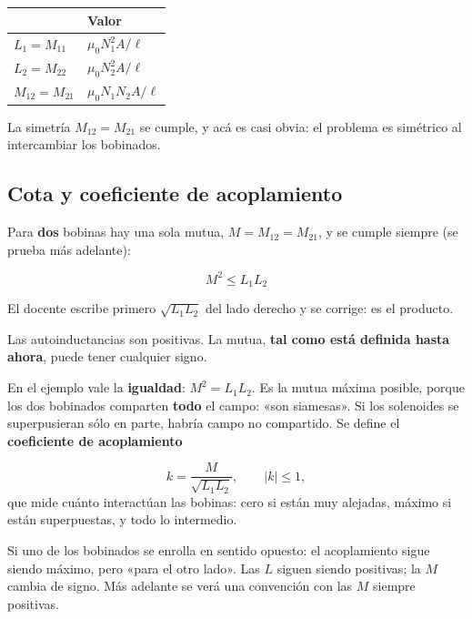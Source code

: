 \documentclass[12pt,a4paper]{article}
\begin{document}
\begin{center}
\renewcommand{\arraystretch}{1.35}
\small
\begin{tabularx}{\textwidth}{l>{\raggedright\arraybackslash}X}
\toprule
 & \textbf{Valor} \\
\midrule
$L_1 = M_{11}$ & $\mu_0 N_1^2 A/\ell$ \\
$L_2 = M_{22}$ & $\mu_0 N_2^2 A/\ell$ \\
$M_{12} = M_{21}$ & $\mu_0 N_1 N_2 A/\ell$ \\
\bottomrule
\end{tabularx}
\end{center}

La simetría $M_{12} = M_{21}$ se cumple, y acá es casi obvia: el problema es
simétrico al intercambiar los bobinados.

\subsection{Cota y coeficiente de acoplamiento}

Para \textbf{dos} bobinas hay una sola mutua, $M = M_{12} = M_{21}$, y se cumple
siempre (se prueba más adelante):

\begin{keybox}
\[
\boxed{\ M^2 \le L_1 L_2\ }
\]
\end{keybox}

\begin{notebox}
El docente escribe primero $\sqrt{L_1L_2}$ del lado derecho y se corrige: es
el producto.
\end{notebox}

Las autoinductancias son positivas. La mutua, \textbf{tal como está definida
hasta ahora}, puede tener cualquier signo.

En el ejemplo vale la \textbf{igualdad}: $M^2 = L_1 L_2$. Es la mutua máxima posible,
porque los dos bobinados comparten \textbf{todo} el campo: «son siamesas». Si los
solenoides se superpusieran sólo en parte, habría campo no compartido. Se define
el \textbf{coeficiente de acoplamiento}

\[
k = \frac{M}{\sqrt{L_1 L_2}},\qquad |k|\le 1,
\]
que mide cuánto interactúan las bobinas: cero si están muy alejadas, máximo si
están superpuestas, y todo lo intermedio.

\begin{notebox}
Si uno de los bobinados se enrolla en sentido
opuesto: el acoplamiento sigue siendo máximo, pero «para el otro lado». Las
$L$ siguen siendo positivas; la $M$ cambia de signo. Más adelante se verá una
convención con las $M$ siempre positivas.
\end{notebox}
\end{document}
